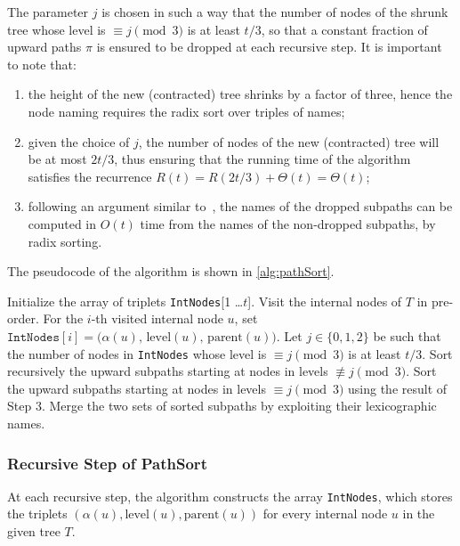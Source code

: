 The parameter $j$ is chosen in such a way that the number of nodes of the shrunk tree whose level is $\equiv j \pmod{3}$ is at least $t/3$, so that a constant fraction of upward paths $\pi$ is ensured to be dropped at each recursive step.
It is important to note that:
\begin{enumerate}
    \item the height of the new (contracted) tree shrinks by a factor of three, hence the node naming requires the radix sort over triples of names; 
    \item given the choice of $j$, the number of nodes of the new (contracted) tree will be at most $2t/3$, thus ensuring that the running time of the algorithm satisfies the recurrence $R(t) = R(2t/3) + \Theta(t) = \Theta(t)$; 
    \item following an argument similar to~\cite{karkkainen2006linear}, the names of the dropped subpaths can be computed in $O(t)$ time from the names of the non-dropped subpaths, by radix sorting.
\end{enumerate}
The pseudocode of the {\pathsort} algorithm is shown in \cref{alg:pathSort}.

\begin{algorithm}
    \caption{{\pathsort}($T$)}
    \label{alg:pathSort}
    \begin{algorithmic}[1]
    \State Initialize the array of triplets \texttt{IntNodes}[1 \dots $t$].
    \State Visit the internal nodes of $T$ in pre-order. For the $i$-th visited internal node $u$, set $\texttt{IntNodes}[i] = \bigl(\alpha(u),\, \text{level}(u),\, \text{parent}(u)\bigr)$.
    \State Let $j \in \{0, 1, 2\}$ be such that the number of nodes in \texttt{IntNodes} whose level is $\equiv j \pmod{3}$ is at least $t/3$. Sort recursively the upward subpaths starting at nodes in levels $\not\equiv j \pmod{3}$.
    \State Sort the upward subpaths starting at nodes in levels $\equiv j \pmod{3}$ using the result of Step 3.
    \State Merge the two sets of sorted subpaths by exploiting their lexicographic names.
    \end{algorithmic}
\end{algorithm}

\subsubsection{Recursive Step of PathSort}
At each recursive step, the algorithm constructs the array \texttt{IntNodes}, which stores the triplets $(\alpha(u), \text{level}(u), \text{parent}(u))$ for every internal node $u$ in the given tree $T$.  

